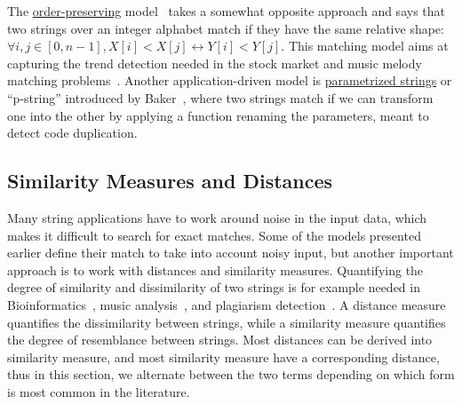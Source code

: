 The \underline{order-preserving} model~\cite{kim2014order,kubica2013linear} takes a somewhat opposite approach and says that two strings over an integer alphabet match if they have the same relative shape: $\forall i,j \in [0,n-1], X[i] < X[j] \leftrightarrow Y[i] < Y[j]$. This matching model aims at capturing the trend detection needed in the stock market and music melody matching problems~\cite{kim2014order}.
%
Another application-driven model is \underline{parametrized strings} or ``p-string'' introduced by Baker~\cite{baker1993theory}, where two strings match if we can transform one into the other by applying a function renaming the parameters, meant to detect code duplication.


\subsection{Similarity Measures and Distances}
Many string applications have to work around noise in the input data, which makes it difficult to search for exact matches. Some of the models presented earlier define their match to take into account noisy input, but another important approach is to work with distances and similarity measures. Quantifying the degree of similarity and dissimilarity of two strings is for example needed in Bioinformatics~\cite{Gusfield1997}, music analysis~\cite{Mongeau1990}, and plagiarism detection~\cite{lukashenko2007computer}. 
%
A distance measure quantifies the dissimilarity between strings, while a similarity measure quantifies the degree of resemblance between strings. Most distances can be derived into similarity measure, and most similarity measure have a corresponding distance, thus in this section, we alternate between the two terms depending on which form is most common in the literature.

